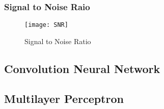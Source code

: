 \documentclass[
	a4paper, %
	11pt, %
]{CSUniSchoolLabReport}
\begin{document}
\subsubsection{Signal to Noise Raio}\label{snr}

\begin{figure}[H] %
	\centering %
	\texttt{[image: SNR]} %
	\caption{Signal to Noise Ratio}\label{fig:snr}
\end{figure}


\subsection{Convolution Neural Network}\label{cnn_visual}

\subsection{Multilayer Perceptron}\label{mlp_visual}










\end{document}
